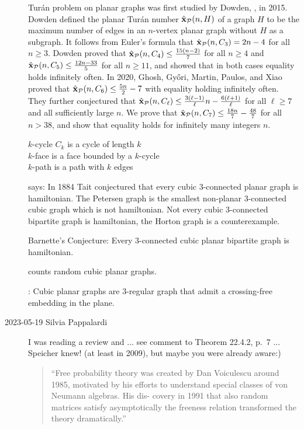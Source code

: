 \begin{description}
Tur{\'a}n problem on planar graphs was first studied by Dowden,
,
in 2015. Dowden defined the planar Tur\'an number ${\hat{\bf x}}_{\mathcal{P}}(n,H)$ of
a graph $H$ to be the maximum number of edges in an $n$-vertex planar graph
without $H$ as a subgraph. It follows from Euler's formula that
${\hat{\bf x}}_{\mathcal{P}}(n, C_3) = 2n - 4$ for all $n \ge 3$. Dowden proved that
${\hat{\bf x}}_{\mathcal{P}}(n, C_4) \le \frac{15(n-2)}{7}$ for all $n \ge 4$ and
${\hat{\bf x}}_{\mathcal{P}}(n, C_5) \le \frac{12n - 33}{5}$ for all $n \ge 11$, and
showed that in both cases equality holds infinitely often. In 2020, Ghosh,
Gy\H ori, Martin, Paulos, and Xiao  proved that
${\hat{\bf x}}_{\mathcal{P}}(n, C_6) \le \frac{5n}{2} - 7$ with equality holding
infinitely often. They further conjectured that ${\hat{\bf x}}_{\mathcal{P}}(n,
C_{\ell}) \le \frac{3(\ell - 1)}{\ell}n - \frac{6(\ell + 1)}{\ell}$ for all
$\ell \ge 7$ and all sufficiently large $n$. We prove that
${\hat{\bf x}}_{\mathcal{P}}(n,C_7) \le \frac{18n}{7} - \frac{48}{7}$ for all $n > 38$,
and show that equality holds for infinitely many integers $n$.

$k$-cycle $C_{k}$ is a cycle of length $k$
\\
$k$-face is a face bounded by a $k$-cycle
\\
$k$-path is a path with $k$ edges

 says: In 1884 Tait conjectured that every cubic
3-connected planar graph is hamiltonian.
The Petersen graph is the smallest
non-planar 3-connected cubic graph which is not hamiltonian.
Not every cubic 3-connected bipartite graph is hamiltonian,
the Horton graph is a counterexample.

Barnette's Conjecture:
Every 3-connected cubic planar bipartite graph is hamiltonian.

 counts random cubic planar graphs.

:
Cubic planar graphs are 3-regular graph that admit a crossing-free embedding in
the plane.

   \item[2023-05-19 Silvia Pappalardi]
I was reading a review  and ...
see comment to Theorem 22.4.2, p.~7 ... Speicher knew! (at least
in 2009), but maybe you were already aware:)

\begin{quote}
``Free probability theory was created by Dan Voiculescu around 1985,
motivated by his efforts to understand special classes of von Neumann
algebras. His dis- covery in 1991 that also random matrices satisfy
asymptotically the freeness relation transformed the theory
dramatically.''


\end{quote}
\end{description}
